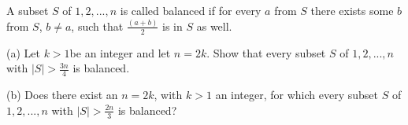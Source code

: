 A subset $S$ of $ {1,2,...,n}$ is called balanced if for every $a $ from $S $ there exists some $ b $from $S$,  $b\neq a$,  such that $ \frac{(a+b)}{2}$  is in $S$ as well.

(a) Let $k > 1 $be an integer and let $n = 2k$. Show that every subset $ S$ of ${1,2,...,n} $ with $|S| > \frac{3n}{4}$  is balanced.

(b) Does there exist an $n =2k$,  with $ k > 1 $ an integer, for which every subset $ S$ of ${1,2,...,n} $ with $ |S| >\frac{2n}{3} $ is balanced?